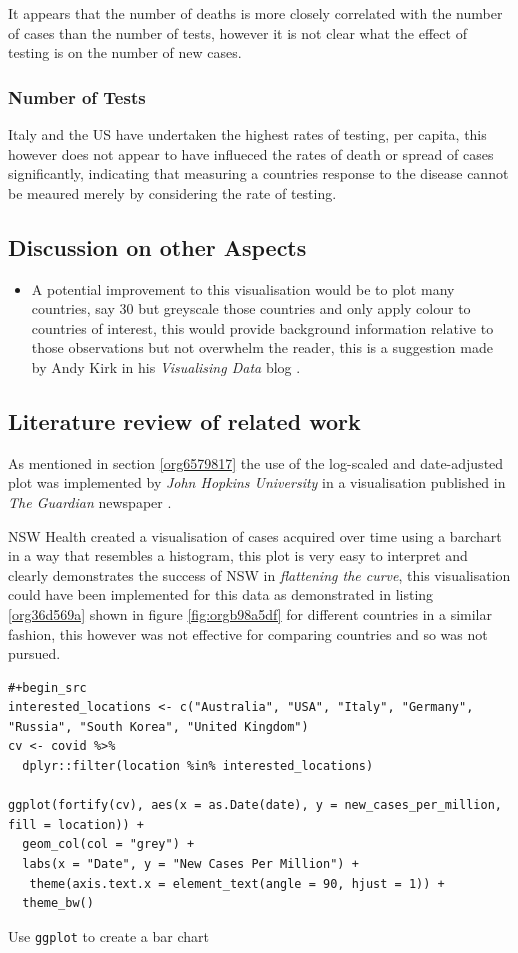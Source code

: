 \documentclass[11pt]{article}
\begin{document}
It appears that the number of deaths is more closely correlated with the number of cases than the number of tests, however it is not clear what the effect of testing is on the number of new cases.
\subsubsection{Number of Tests}
\label{sec:orgdf6031b}
Italy and the US have undertaken the highest rates of testing, per capita, this
however does not appear to have influeced the rates of death or spread of cases significantly, indicating that measuring a countries response to the disease cannot be meaured merely by considering the rate of testing.


\subsection{Discussion on other Aspects}
\label{sec:org8789bd2}
\begin{itemize}
\item A potential improvement to this visualisation would be to plot many countries, say 30 but greyscale those countries and only apply colour to countries of interest, this would provide background information relative to those observations but not overwhelm the reader, this is a suggestion made by Andy Kirk in his \emph{Visualising Data} blog  \cite{kirk2015}.
\end{itemize}
\subsection{Literature review of related work}
\label{sec:org9e3ab94}
As mentioned in section \ref{org6579817} the use of the log-scaled and date-adjusted plot was implemented by \emph{John Hopkins University} in a visualisation published in \emph{The Guardian} newspaper \cite{gutierrez2020}.


NSW Health created a visualisation of cases acquired over time using a barchart
in a way that resembles a histogram, \cite{nswhealth2020} this plot is very easy
to interpret and clearly demonstrates the success of NSW in \emph{flattening the
curve}, this visualisation could have been implemented for this data as demonstrated in listing \ref{org36d569a} shown in figure \ref{fig:orgb98a5df} for different countries in a similar fashion, this however was not effective for comparing countries and so was not pursued.


\begin{listing}[htbp]
\begin{verbatim}
#+begin_src
interested_locations <- c("Australia", "USA", "Italy", "Germany", "Russia", "South Korea", "United Kingdom")
cv <- covid %>%
  dplyr::filter(location %in% interested_locations)

ggplot(fortify(cv), aes(x = as.Date(date), y = new_cases_per_million, fill = location)) +
  geom_col(col = "grey") +
  labs(x = "Date", y = "New Cases Per Million") +
   theme(axis.text.x = element_text(angle = 90, hjust = 1)) +
  theme_bw()
\end{verbatim}
\caption{\label{org36d569a}Use \texttt{ggplot} to create a bar chart}
\end{listing}
\end{document}
